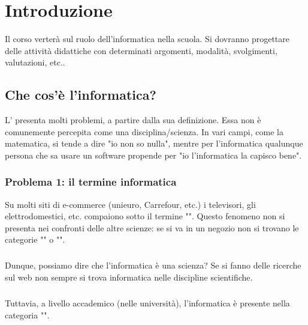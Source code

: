 \chapter{Introduzione}

Il corso verterà sul ruolo dell'informatica nella scuola. Si dovranno progettare delle attività didattiche con determinati argomenti, modalità, svolgimenti, valutazioni, etc.. 


\section{Che cos'è l'informatica?}

L' presenta molti problemi, a partire dalla sua definizione. Essa non è comunemente percepita come una disciplina/scienza. In vari campi, come la matematica, si tende a dire "io non so nulla", mentre per l'informatica qualunque persona che sa usare un software propende per "io l'informatica la capisco bene".

\subsection{Problema 1: il termine informatica}

Su molti siti di e-commerce (unieuro, Carrefour, etc.) i televisori, gli elettrodomestici, etc. compaiono sotto il termine "". Questo fenomeno non si presenta nei confronti delle altre scienze: se si va in un negozio non si trovano le categorie "" o "".
\paragraph{}
Dunque, possiamo dire che l'informatica è una scienza? Se si fanno delle ricerche sul web non sempre si trova informatica nelle discipline scientifiche.
\paragraph{}
Tuttavia, a livello accademico (nelle università), l'informatica è presente nella categoria "". 


